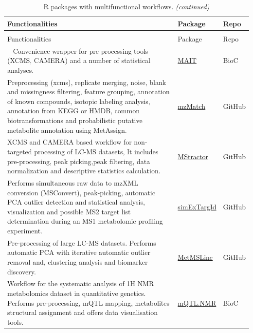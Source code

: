 \documentclass[]{article}
\begin{document}
\begin{longtable}{>{\raggedright\arraybackslash}p{30em}>{\raggedright\arraybackslash}p{10em}>{\raggedright\arraybackslash}p{3em}}
\caption{\label{tab:tab9}R packages with multifunctional workflows.}\\
\toprule
Functionalities & Package & Repo\\
\midrule
\endfirsthead
\caption[]{\label{tab:tab9}R packages with multifunctional workflows. \textit{(continued)}}\\
\toprule
Functionalities & Package & Repo\\
\midrule
\endhead
\
\endfoot
\bottomrule
\endlastfoot
\rowcolor{gray!6}  Convenience wrapper for pre-processing tools (XCMS, CAMERA) and a number of statistical analyses. & \href{https://www.bioconductor.org/packages/release/bioc/html/MAIT.html}{MAIT} & BioC\\
Preprocessing (xcms), replicate merging, noise, blank and missingness filtering, feature grouping, annotation of known compounds, isotopic labeling analysis, annotation from KEGG or HMDB, common biotransformations and probabilistic putative metabolite annotation using MetAssign. & \href{https://github.com/andzajan/mzmatch.R}{mzMatch} & GitHub\\
\rowcolor{gray!6}  XCMS and CAMERA based workflow for non-targeted processing of LC-MS datasets, It includes pre-processing, peak picking,peak filtering, data normalization and descriptive statistics calculation. & \href{https://github.com/search?q=MStractor}{MStractor} & GitHub\\
Performs simultaneous raw data to mzXML conversion (MSConvert), peak-picking, automatic PCA outlier detection and statistical analysis, visualization and possible MS2 target list determination during an MS1 metabolomic profiling experiment. & \href{https://github.com/WMBEdmands/simExTargId}{simExTargId} & GitHub\\
\rowcolor{gray!6}  Pre-processing of large LC-MS datasets. Performs automatic PCA with iterative automatic outlier removal and, clustering analysis and biomarker discovery. & \href{https://github.com/WMBEdmands/MetMSLine}{MetMSLine} & GitHub\\
\addlinespace
Workflow for the systematic analysis of 1H NMR metabolomics dataset in quantitative genetics. Performs pre-processing, mQTL mapping, metabolites structural assignment and offers data visualisation tools. & \href{https://www.bioconductor.org/packages/3.5/bioc/html/mQTL.NMR.html}{mQTL.NMR} & BioC\\

\end{longtable}
\end{document}
